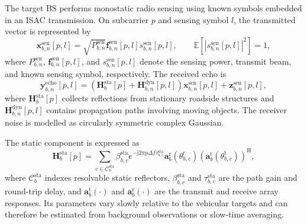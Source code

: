 The target BS performs monostatic radio sensing using known symbols embedded in
an ISAC transmission.  On subcarrier \(p\) and sensing symbol \(l\), the
transmitted vector is represented by
\begin{equation}
    \mathbf{x}^{\mathrm{sen}}_{b,n}[p,l]
    =\sqrt{P^{\mathrm{sen}}_{b,n}}
    \mathbf{f}^{\mathrm{sen}}_{b,n}[p,l]s^{\mathrm{sen}}_{b,n}[p,l],
    \qquad
    \mathbb{E}\!\left[\left|s^{\mathrm{sen}}_{b,n}[p,l]\right|^2\right]=1,
    \label{eq:system-isac-transmit}
\end{equation}
where \(P^{\mathrm{sen}}_{b,n}\),
\(\mathbf{f}^{\mathrm{sen}}_{b,n}[p,l]\), and
\(s^{\mathrm{sen}}_{b,n}[p,l]\) denote the sensing power, transmit beam, and
known sensing symbol, respectively.  The received echo is
\begin{equation}
    \mathbf{y}^{\mathrm{echo}}_{b,n}[p,l]
    =\left(\mathbf{H}^{\mathrm{sta}}_{b}[p]
    +\mathbf{H}^{\mathrm{dyn}}_{b,n}[p,l]\right)
    \mathbf{x}^{\mathrm{sen}}_{b,n}[p,l]
    +\mathbf{z}^{\mathrm{sen}}_{b,n}[p,l],
    \label{eq:system-isac-echo}
\end{equation}
where \(\mathbf{H}^{\mathrm{sta}}_{b}[p]\) collects reflections from
stationary roadside structures and \(\mathbf{H}^{\mathrm{dyn}}_{b,n}[p,l]\)
contains propagation paths involving moving objects.  The receiver noise is
modelled as circularly symmetric complex Gaussian.

The static component is expressed as
\begin{equation}
    \mathbf{H}^{\mathrm{sta}}_{b}[p]
    =\sum_{c\in\mathcal{C}^{\mathrm{sta}}_b}
    \beta^{\mathrm{sta}}_{b,c}
    e^{-\mathrm{j}2\pi p\Delta f\tau^{\mathrm{sta}}_{b,c}}
    \mathbf{a}^{\mathrm{r}}_b\!\left(\theta^{\mathrm{r}}_{b,c}\right)
    \left(\mathbf{a}^{\mathrm{t}}_b
    \!\left(\theta^{\mathrm{t}}_{b,c}\right)\right)^{\mathrm{H}},
    \label{eq:system-isac-static-channel}
\end{equation}
where \(\mathcal{C}^{\mathrm{sta}}_b\) indexes resolvable static reflectors,
\(\beta^{\mathrm{sta}}_{b,c}\) and \(\tau^{\mathrm{sta}}_{b,c}\) are the
path gain and round-trip delay, and \(\mathbf{a}^{\mathrm{t}}_b(\cdot)\) and
\(\mathbf{a}^{\mathrm{r}}_b(\cdot)\) are the transmit and receive array
responses.  Its parameters vary slowly relative to the vehicular targets and
can therefore be estimated from background observations or slow-time averaging.

